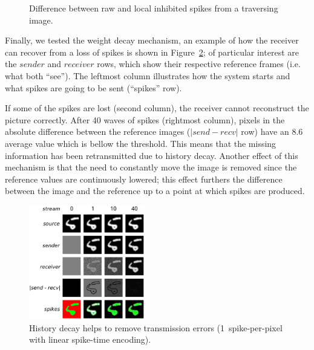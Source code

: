 \documentclass[conference]{IEEEtran}
\begin{document}
\begin{figure}[htb]
  \caption[Difference between raw and local inhibited spikes from a traversing image.]{Difference between raw and local inhibited spikes from a traversing image.}
  \label{fig:inh_diff}
\end{figure}

Finally, we tested the weight decay mechanism, an example of how the receiver can recover from a loss of spikes is shown in Figure~\ref{fig:history_decay}; of particular interest are the $sender$ and $receiver$ rows, which show their respective reference frames (i.e. what both ``see''). The leftmost column illustrates how the system starts and what spikes are going to be sent (``spikes'' row).

If some of the spikes are lost (second column), the receiver cannot reconstruct the picture correctly. After 40 waves of spikes (rightmost column),  pixels in the absolute difference between the reference images ($|send-recv|$ row) have an 8.6 average value which is bellow the threshold. This means that the missing information has been retransmitted due to history decay. Another effect of this mechanism is that the need to constantly move the image is removed since the reference values are continuously lowered; this effect furthers the difference between the image and the reference up to a point at which spikes are produced.

\setcounter{figure}{13} %
\begin{figure}[htb]
  \centering
  
  \includegraphics[width=0.45\textwidth]{history_decay}
  \caption{History decay helps to remove transmission errors (1~spike-per-pixel with linear spike-time encoding).}
  \label{fig:history_decay}
\end{figure}
\end{document}
